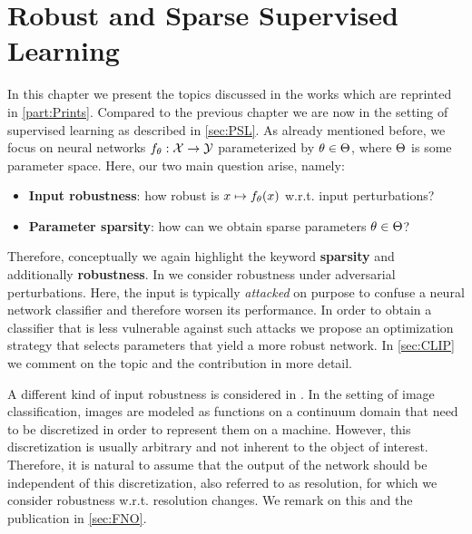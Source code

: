 \chapter{Robust and Sparse Supervised Learning}\label{ch:SL}
%
%
In this chapter we present the topics discussed in the works \cite{bungert2021clip, kabri2023resolution, bungert2022bregman} which are reprinted in \cref{part:Prints}. Compared to the previous chapter we are now in the setting of supervised learning as described in \cref{sec:PSL}. As already mentioned before, we focus on neural networks $f_\theta:\mathcal{X}\to\mathcal{\mathcal{Y}}$ parameterized by $\theta\in\Theta$, where $\Theta$ is some parameter space. Here, our two main question arise, namely:
\begin{itemize}
\item \textbf{Input robustness}: how robust is $x\mapsto f_\theta(x)$ w.r.t. input perturbations? 
\item \textbf{Parameter sparsity}: how can we obtain sparse parameters $\theta\in\Theta$?
\end{itemize}
%
%
\begin{center}%
\end{center}
%
%
Therefore, conceptually we again highlight the keyword \textbf{sparsity} and additionally \textbf{robustness}. In \cite{bungert2021clip} we consider robustness under adversarial perturbations. Here, the input is typically \emph{attacked} on purpose to confuse a neural network classifier and therefore worsen its performance. In order to obtain a classifier that is less vulnerable against such attacks we propose an optimization strategy that selects parameters that yield a more robust network. In \cref{sec:CLIP} we comment on the topic and the contribution in more detail. 

A different kind of input robustness is considered in \cite{kabri2023resolution}. In the setting of image classification, images are modeled as functions on a continuum domain that need to be discretized in order to represent them on a machine. However, this discretization is usually arbitrary and not inherent to the object of interest. Therefore, it is natural to assume that the output of the network should be independent of this discretization, also referred to as resolution, for which we consider robustness w.r.t. resolution changes. We remark on this and the publication in \cref{sec:FNO}.

